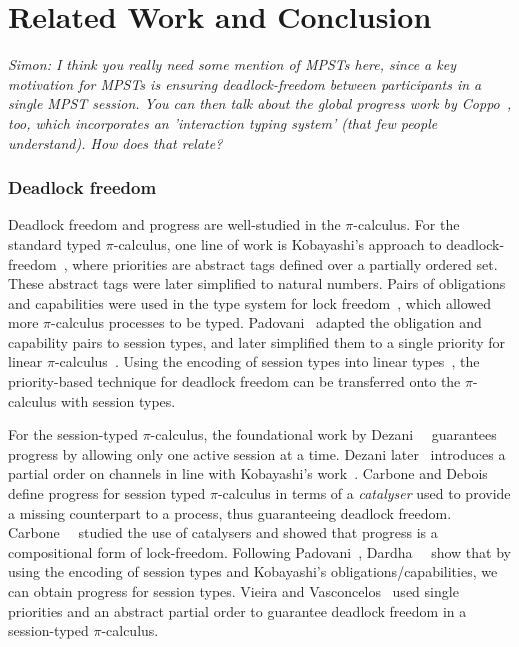 \documentclass[main.tex]{subfiles}
\begin{document}
\section{Related Work and Conclusion}
\textit{Simon: I think you really need some mention of MPSTs here, since a key motivation for MPSTs is ensuring deadlock-freedom between participants in a single MPST session. You can then talk about the global progress work by Coppo~\etal, too, which incorporates an 'interaction typing system' (that few people understand). How does that relate?}

\subsubsection*{Deadlock freedom}
Deadlock freedom and progress are well-studied in the $\pi$-calculus.
For the standard typed $\pi$-calculus, one line of work is Kobayashi's approach to deadlock-freedom~\cite{kobayashi98}, where priorities are abstract tags defined over a partially ordered set. These abstract tags were later simplified to natural numbers. Pairs of obligations and capabilities were used in the type system for lock freedom~\cite{kobayashi02,kobayashi06}, which allowed more $\pi$-calculus processes to be typed. Padovani~\cite{padovani13} adapted the obligation and capability pairs to session types, and later simplified them to a single priority for linear $\pi$-calculus~\cite{padovani14}. Using the encoding of session types into linear types~\cite{kobayashi07,dardhagiachino12,dardha14beat,dardha16}, the priority-based technique for deadlock freedom can be transferred onto the $\pi$-calculus with session types.

For the session-typed $\pi$-calculus, the foundational work by Dezani~\etal~\cite{dezani-ciancaglinimostrous06} guarantees progress by allowing only one active session at a time. Dezani later~\cite{dezani-ciancagliniliguoro09progress} introduces a partial order on channels in line with Kobayashi's work~\cite{kobayashi98}. Carbone and Debois~\cite{carbonedebois10} define progress for session typed $\pi$-calculus in terms of a \emph{catalyser} used to provide a missing counterpart to a process, thus guaranteeing deadlock freedom.
Carbone~\etal~\cite{carbonedardha14} studied the use of catalysers and showed that progress is a compositional form of lock-freedom. Following Padovani~\cite{padovani14}, Dardha~\etal~\cite{dardhagiachino12} show that by using the encoding of session types and Kobayashi's obligations/capabilities, we can obtain progress for session types. Vieira and Vasconcelos~\cite{vieiravasconcelos13} used single priorities and an abstract partial order to guarantee deadlock freedom in a session-typed $\pi$-calculus.
\end{document}
